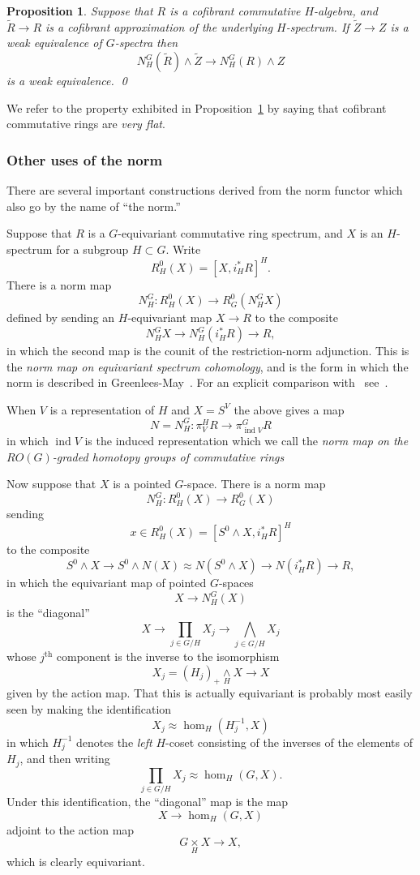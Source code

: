 \documentclass{amsart}
\newtheorem{prop}[equation]{Proposition}
\theoremstyle{definition}
\theoremstyle{remark}
\newcommand{\smashove}[1]{\underset{#1}{\wedge}}
\newcommand{\norm}{N}
\DeclareMathOperator{\ind}{ind}
\begin{document}
\begin{prop}
\label{thm:56}
Suppose that $R$ is a cofibrant commutative $H$-algebra, and $\tilde
R\to R$ is a cofibrant approximation of the underlying $H$-spectrum.
If $\tilde Z\to Z$ is a weak equivalence of $G$-spectra then
\[
\norm_{H}^{G}(\tilde R)\wedge \tilde Z\to \norm_{H}^{G}(R) \wedge Z
\]
is a weak equivalence.  \qed
\end{prop}

We refer to the property exhibited in Proposition~\ref{thm:56} by
saying that cofibrant commutative rings are {\em very flat}.

\subsubsection{Other uses of the norm}
\label{sec:other-uses-norm}

There are several important constructions derived from the norm
functor which also go by the name of ``the norm.''

Suppose that $R$ is a $G$-equivariant commutative ring spectrum, and
$X$ is an $H$-spectrum for a subgroup $H\subset G$.  Write
\[
R^{0}_{H}(X) = [X,i_{H}^{\ast}R]^{H}.
\]
There is a norm map
\[
\norm_{H}^{G}:R^{0}_{H}(X)  \to R^{0}_{G}(\norm_{H}^{G} X)
\]
defined by sending an $H$-equivariant map $X\to R$ to the composite
\[
\norm_{H}^{G} X\to \norm_{H}^{G} (i_{H}^{\ast}R)\to R,
\]
in which the second map is the counit of the restriction-norm
adjunction.  This is the {\em norm map on equivariant spectrum
cohomology}, and is the form in which the norm is described in
Greenlees-May~\cite{MR1491447}.   For an explicit comparison
with~\cite{MR1491447} see~\cite{MR3162261}.

When $V$ is a representation of $H$ and $X=S^{V}$ the above gives a
map
\[
\norm = \norm_{H}^{G}: \pi^{H}_{V} R \to \pi^{G}_{\ind V} R
\]
in which $\ind V$ is the induced representation which we call the {\em
norm map on the $RO(G)$-graded homotopy groups of commutative rings}

Now suppose that $X$ is a pointed $G$-space.  There is a norm map
\[
\norm_{H}^{G}:R^{0}_{H}(X)\to R^{0}_{G}(X)
\]
sending
\[
x\in R^{0}_{H}(X) = [S^{0}\wedge X, i_{H}^{\ast}R]^{H}
\]
to the composite
\[
S^{0}\wedge X \to S^{0}\wedge \norm(X) \approx \norm(S^{0}\wedge X)\to
\norm(i_{H}^{\ast}R)\to R,
\]
in which the equivariant map of pointed $G$-spaces
\[
X\to \norm_{H}^{G}(X)
\]
is the ``diagonal'' 
\[
X\to \prod_{j\in G/H}X_{j}\to \bigwedge_{j\in G/H} X_{j}
\]
whose $j^{\text{th}}$ component is the inverse to the isomorphism
\[
X_{j}= (H_{j})_{+}\smashove{H} X\to X
\]
given by the action map.   That this is actually equivariant is probably
most easily seen by making the identification
\[
X_{j} \approx \hom_{H}(H_{j}^{-1},X)
\]
in which $H_{j}^{-1}$ denotes the {\em left} $H$-coset consisting of
the inverses of the elements of $H_{j}$, and then writing
\[
\prod_{j\in G/H} X_{j} \approx \hom_{H}(G,X).
\]
Under this identification, the ``diagonal'' map  is the map
\[
X\to \hom_{H}(G,X)
\]
adjoint to the action map 
\[
G\underset{H}{\times}X\to X,
\]
which is clearly equivariant.   
\end{document}
